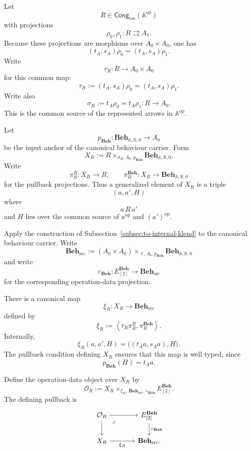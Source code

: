 Let
\[
    R\in
    \mathsf{Cong}_{\mathrm{ioo}}
    (\mathbb A^{\mathrm{op}})
\]
with projections
\[
    \rho_0,\rho_1:
    R\rightrightarrows A_1.
\]
Because these projections are morphisms over
\(A_0\times A_0\), one has
\[
    (t_A,s_A)\rho_0
    =
    (t_A,s_A)\rho_1.
\]
Write
\[
    \tau_R:
    R\to A_0\times A_0
\]
for this common map:
\[
    \tau_R
    :=
    (t_A,s_A)\rho_0
    =
    (t_A,s_A)\rho_1.
\]
Write also
\[
    \sigma_R
    :=
    t_A\rho_0
    =
    t_A\rho_1:
    R\to A_0.
\]
This is the common source of the represented arrows in
\(\mathbb A^{\mathrm{op}}\).

Let
\[
    p_{\mathbf{Beh}}:
    \mathbf{Beh}_{\mathbb A,\mathbb B,0}
    \to A_0
\]
be the input anchor of the canonical behaviour carrier. Form
\[
    X_R
    :=
    R
    \times_{\sigma_R,A_0,p_{\mathbf{Beh}}}
    \mathbf{Beh}_{\mathbb A,\mathbb B,0}.
\]
Write
\[
    \pi_R^{R}:X_R\to R,
    \qquad
    \pi_R^{\mathbf{Beh}}:
    X_R\to
    \mathbf{Beh}_{\mathbb A,\mathbb B,0}
\]
for the pullback projections. Thus a generalized element of \(X_R\) is a
triple
\[
    (a,a',H)
\]
where
\[
    a\,R\,a'
\]
and \(H\) lies over the common source of \(a^{\mathrm{op}}\) and
\((a')^{\mathrm{op}}\).

Apply the construction of
Subsection~\ref{subsec:to-internal-klend} to the canonical behaviour carrier.
Write
\[
    \mathbf{Beh}_{\mathrm{src}}
    :=
    (A_0\times A_0)
    \times_{\ell,A_0,p_{\mathbf{Beh}}}
    \mathbf{Beh}_{\mathbb A,\mathbb B,0}
\]
and write
\[
    \varepsilon_{\mathbf{Beh}}:
    E_{[2]}^{\mathbf{Beh}}
    \to
    \mathbf{Beh}_{\mathrm{src}}
\]
for the corresponding operation-data projection.

There is a canonical map
\[
    \xi_R:
    X_R\to\mathbf{Beh}_{\mathrm{src}}
\]
defined by
\[
    \xi_R
    :=
    \left\langle
        \tau_R\pi_R^R,
        \pi_R^{\mathbf{Beh}}
    \right\rangle.
\]
Internally,
\[
    \xi_R(a,a',H)
    =
    \bigl(
        (t_Aa,s_Aa),
        H
    \bigr).
\]
The pullback condition defining \(X_R\) ensures that this map is well typed,
since
\[
    p_{\mathbf{Beh}}(H)=t_Aa.
\]

Define the operation-data object over \(X_R\) by
\[
    \mathcal O_R
    :=
    X_R
    \times_{
        \xi_R,\,
        \mathbf{Beh}_{\mathrm{src}},\,
        \varepsilon_{\mathbf{Beh}}
    }
    E_{[2]}^{\mathbf{Beh}}.
\]
The defining pullback is
\[
\begin{tikzcd}[column sep=large]
    \mathcal O_R
        \arrow[r]
        \arrow[d]
        \arrow[dr, phantom, "\lrcorner", very near start]
    &
    E_{[2]}^{\mathbf{Beh}}
        \arrow[d, "\varepsilon_{\mathbf{Beh}}"]
    \\
    X_R
        \arrow[r, "\xi_R"']
    &
    \mathbf{Beh}_{\mathrm{src}}.
\end{tikzcd}
\]

